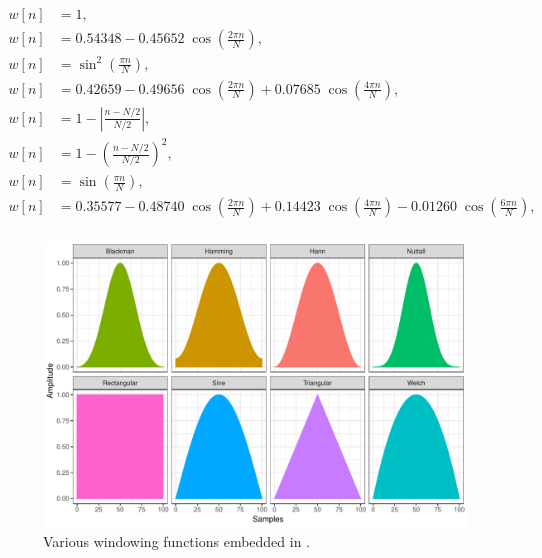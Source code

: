 \documentclass[a4paper,9pt]{extarticle}
\newcommand*{\method}[1]{\text{#1}\xspace}
\newcommand*{\smashpp}   {\method{Smash++}}
\begin{document}
\begin{align}
  w[n] & = 1,
  \tag*{\small(rectangular)} \\
  w[n] & = 0.54348-0.45652\;\cos \left(\tfrac {2\pi n}{N}\right),
  \tag*{\small(Hamming)} \\
  w[n] & = \sin^2 \left(\tfrac {\pi n}{N}\right),
  \tag*{\small(Hann)} \\
  w[n] & = 0.42659-0.49656\;\cos \left(\tfrac {2\pi n}{N}\right)+0.07685\;\cos \left(\tfrac {4\pi n}{N}\right),
  \tag*{\small(Blackman)} \\
  w[n] & = 1-\left|\tfrac {n-N/2}{N/2}\right|,
  \tag*{\small(triangular/Bartlett)} \\
  w[n] & = 1-\left(\tfrac {n-N/2}{N/2}\right)^{2},
  \tag*{\small(Welch)} \\
  w[n] & = \sin \left(\tfrac {\pi n}{N}\right),
  \tag*{\small(sine)} \\
  w[n] & = 0.35577-0.48740\;\cos \left(\tfrac {2\pi n}{N}\right)+0.14423\;\cos \left(\tfrac {4\pi n}{N}\right)-0.01260\;\cos \left(\tfrac {6\pi n}{N}\right),
  \tag*{\small(Nuttall)} \\
  \label{eq.filter}
\end{align}

\begin{figure}[!h]
  \centering
  \includegraphics[width=.8\linewidth]{fig/filters.pdf}
  \caption{Various windowing functions embedded in \smashpp.}
  \label{fig.filters}
\end{figure}
\end{document}

